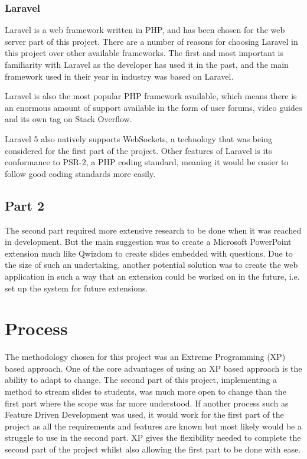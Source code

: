 \subsubsection{Laravel}
Laravel is a web framework written in PHP, and has been chosen for the web server part of this project\cite{laravel}. There are a number of reasons for choosing Laravel in this project over other available frameworks. The first and most important is familiarity with Laravel as the developer has used it in the past, and the main framework used in their year in industry was based on Laravel.

Laravel is also the most popular PHP framework available\cite{PopularPHPFrameworks}, which means there is an enormous amount of support available in the form of user forums, video guides and its own tag on Stack Overflow.

Laravel 5 also natively supports WebSockets, a technology that was being considered for the first part of the project. Other features of Laravel is its conformance to PSR-2, a PHP coding standard, meaning it would be easier to follow good coding standards more easily.
\subsection{Part 2}
The second part required more extensive research to be done when it was reached in development. But the main suggestion was to create a Microsoft PowerPoint extension much like Qwizdom to create slides embedded with questions\cite{powerpoint-addins}. Due to the size of such an undertaking, another potential solution was to create the web application in such a way that an extension could be worked on in the future, i.e. set up the system for future extensions.
\newpage

\section{Process}
The methodology chosen for this project was an Extreme Programming\cite{xp} (XP) based approach. One of the core advantages of using an XP based approach is the ability to adapt to change. The second part of this project, implementing a method to stream slides to students, was much more open to change than the first part where the scope was far more understood. If another process such as Feature Driven Development was used, it would work for the first part of the project as all the requirements and features are known but most likely would be a struggle to use in the second part. XP gives the flexibility needed to complete the second part of the project whilst also allowing the first part to be done with ease.

